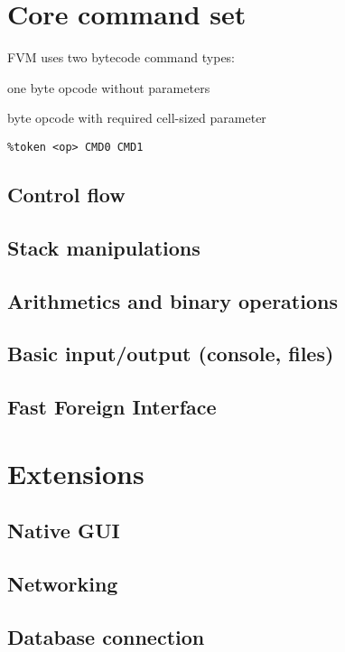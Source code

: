 \section{Core command set}

FVM uses two bytecode command types:
\begin{description}[nosep]
\item[CMD0] one byte opcode without parameters
\item[CMD1] byte opcode with required cell-sized parameter
\end{description}

\begin{lstlisting}[title=ypp.ypp: yacc syntax parser]
%defines %union { char *s; uint8_t op; uint32_t n; }
%token <op> CMD0 CMD1
\end{lstlisting}

\subsection{Control flow}
\subsection{Stack manipulations}
\subsection{Arithmetics and binary operations}
\subsection{Basic input/output (console, files)}
\subsection{Fast Foreign Interface}

\section{Extensions}
\subsection{Native GUI}
\subsection{Networking}
\subsection{Database connection}

